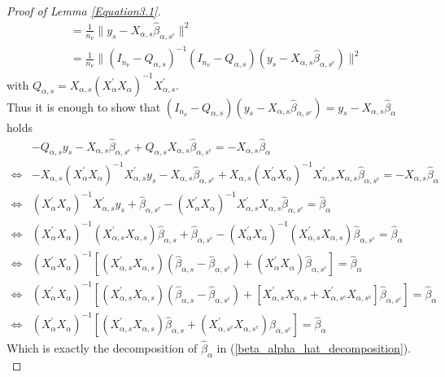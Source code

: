 \documentclass[Research_Module_ES.tex]{subfiles}
\begin{document}
\begin{proof}[Proof of Lemma \ref{Equation3.1}]
\begin{align*}
	&=\frac{1}{n_\nu}\parallel y_s-X_{\alpha,s}\hat{\beta}_{\alpha,s^c}\parallel^2\\
	&=\frac{1}{n_\nu}\parallel (I_{n_\nu}-Q_{\alpha,s})^{-1}(I_{n_\nu}-Q_{\alpha,s})(y_s-X_{\alpha,s}\hat{\beta}_{\alpha,s^c})\parallel^2
	\end{align*}
	with $Q_{\alpha,s}=X_{\alpha,s}(X_\alpha^\prime X_\alpha)^{-1}X_{\alpha,s}^\prime$.\\ 
	Thus it is enough to show that $(I_{n_\nu}-Q_{\alpha,s})(y_s-X_{\alpha,s}\hat{\beta}_{\alpha,s^c})=y_s-X_{\alpha,s}\hat{\beta}_\alpha$ holds 
	\begin{align*}
		&-Q_{\alpha,s}y_s-X_{\alpha,s}\hat{\beta}_{\alpha,s^c}+Q_{\alpha,s}X_{\alpha,s}\hat{\beta}_{\alpha,s^c}=-X_{\alpha,s}\hat{\beta}_\alpha\\
		\Leftrightarrow&-X_{\alpha,s}(X_{\alpha}^\prime X_{\alpha})^{-1}X_{\alpha,s}^\prime y_s- X_{\alpha,s}\hat{\beta}_{\alpha,s^c}+X_{\alpha,s}(X_{\alpha}^\prime X_{\alpha})^{-1}X_{\alpha,s}^\prime X_{\alpha,s}\hat{\beta}_{\alpha,s^c}=-X_{\alpha,s}\hat{\beta}_{\alpha}\\
		\Leftrightarrow&(X_{\alpha}^\prime X_{\alpha})^{-1}X_{\alpha,s}^\prime y_s+ \hat{\beta}_{\alpha,s^c}-(X_{\alpha}^\prime X_{\alpha})^{-1}X_{\alpha,s}^\prime X_{\alpha,s}\hat{\beta}_{\alpha,s^c}=\hat{\beta}_{\alpha}\\
		\Leftrightarrow&(X_{\alpha}^\prime X_{\alpha})^{-1}(X_{\alpha,s}^\prime X_{\alpha,s})\hat{\beta}_{\alpha,s}+ \hat{\beta}_{\alpha,s^c}-(X_{\alpha}^\prime X_{\alpha})^{-1}(X_{\alpha,s}^\prime X_{\alpha,s})\hat{\beta}_{\alpha,s^c}=\hat{\beta}_{\alpha}\\
		\Leftrightarrow&(X_{\alpha}^\prime X_{\alpha})^{-1}[(X_{\alpha,s}^\prime X_{\alpha,s})(\hat{\beta}_{\alpha,s}-\hat{\beta}_{\alpha,s^c})+(X_{\alpha}^\prime X_{\alpha})\hat{\beta}_{\alpha,s^c}]=\hat{\beta}_{\alpha}\\
		\Leftrightarrow&(X_{\alpha}^\prime X_{\alpha})^{-1}[(X_{\alpha,s}^\prime X_{\alpha,s})(\hat{\beta}_{\alpha,s}-\hat{\beta}_{\alpha,s^c})+[X_{\alpha,s}^\prime X_{\alpha,s}+X_{\alpha,s^c}^\prime X_{\alpha,s^c}]\hat{\beta}_{\alpha,s^c}]=\hat{\beta}_{\alpha}\\
		\Leftrightarrow&(X_\alpha^\prime X_\alpha)^{-1}[(X_{\alpha,s}^\prime X_{\alpha,s}) \hat{\beta}_{\alpha,s}+(X_{\alpha,s^c}^\prime X_{\alpha,s^c})\hat{\beta}_{\alpha,s^c}]=\hat{\beta}_{\alpha}
	\end{align*}
Which is exactly the decomposition of $\hat{\beta}_{\alpha}$ in   (\ref{beta_alpha_hat_decomposition}).\\
\end{proof}
\end{document}
